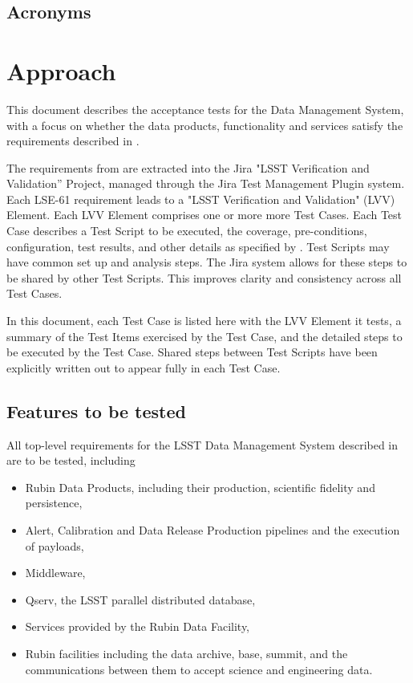 \documentclass[DM,lsstdraft,STS,toc]{lsstdoc}
\begin{document}
\subsection{Acronyms \label{sect:acronyms}} %



\section{Approach}
\label{sec:approach}

This document describes the acceptance tests for the  Data Management System,
with a focus on whether the data products, functionality and services satisfy the requirements described in .

The requirements from  are extracted into the Jira "LSST Verification and Validation'' Project, managed through the Jira Test Management Plugin system.  
Each LSE-61 requirement leads to a "LSST Verification and Validation" (LVV) Element.  
Each LVV Element comprises one or more more Test Cases.  
Each Test Case describes a Test Script to be executed, the coverage, pre-conditions, configuration, test results, and other details as specified by . 
Test Scripts may have common set up and analysis steps. 
The Jira system allows for these steps to be shared by other Test Scripts.  This improves clarity and consistency across all Test Cases.

In this document, each Test Case is listed here with the LVV Element it tests, a summary of the Test Items exercised by the Test Case, and the detailed steps to be executed by the Test Case.  
Shared steps between Test Scripts have been explicitly written out to appear fully in each Test Case.

\subsection{Features to be tested}
\label{sec:feat2test}

All top-level requirements for the LSST Data Management System described in  are to be tested, including
\begin{itemize}
\item Rubin Data Products, including their production, scientific fidelity and persistence, 
\item Alert, Calibration and Data Release Production pipelines and the execution of payloads, 
\item Middleware,
\item Qserv, the LSST parallel distributed database,
\item Services provided by the Rubin Data Facility,
\item Rubin facilities including the data archive, base, summit, and the communications between them to accept science and engineering data.
\end{itemize}
\end{document}

